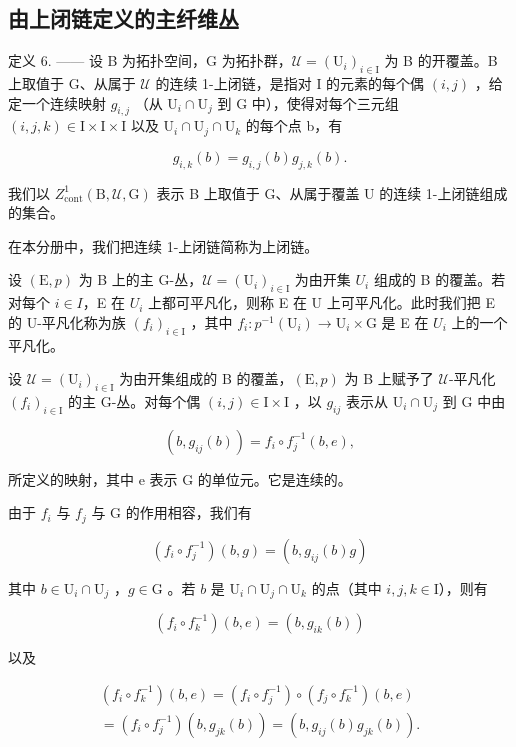 \subsection{由上闭链定义的主纤维丛}

定义 6. —— 设 B 为拓扑空间，G 为拓扑群，\(\mathcal{U} = (\mathrm{U}_{i})_{i\in \mathrm{I}}\) 为 B 的开覆盖。B 上取值于 G、从属于 \(\mathcal{U}\) 的连续 1-上闭链，是指对 I 的元素的每个偶 \((i,j)\) ，给定一个连续映射 \(g_{i,j}\) （从 \(\mathrm{U}_i\cap \mathrm{U}_j\) 到 G 中），使得对每个三元组 \((i,j,k)\in \mathrm{I}\times \mathrm{I}\times \mathrm{I}\) 以及 \(\mathrm{U}_i\cap \mathrm{U}_j\cap \mathrm{U}_k\) 的每个点 b，有

\[
g _ {i, k} (b) = g _ {i, j} (b) g _ {j, k} (b).
\]

我们以 \(Z_{\mathrm{cont}}^{1}(\mathrm{B},\mathcal{U},\mathrm{G})\) 表示 B 上取值于 G、从属于覆盖 U 的连续 1-上闭链组成的集合。

在本分册中，我们把连续 1-上闭链简称为上闭链。

设 \((\mathrm{E},p)\) 为 B 上的主 G-丛，\(\mathcal{U} = (\mathrm{U}_{i})_{i\in\mathrm{I}}\) 为由开集 \(U_{i}\) 组成的 B 的覆盖。若对每个 \(i\in I\)，E 在 \(U_{i}\) 上都可平凡化，则称 E 在 U 上可平凡化。此时我们把 E 的 U-平凡化称为族 \((f_{i})_{i\in\mathrm{I}}\) ，其中 \(f_{i}\colon p^{-1}(\mathrm{U}_{i})\to\mathrm{U}_{i}\times\mathrm{G}\) 是 E 在 \(U_{i}\) 上的一个平凡化。

设 \(\mathcal{U} = (\mathrm{U}_i)_{i\in \mathrm{I}}\) 为由开集组成的 B 的覆盖，\((\mathrm{E},p)\) 为 B 上赋予了 \(\mathcal{U}\)-平凡化 \((f_i)_{i\in \mathrm{I}}\) 的主 G-丛。对每个偶 \((i,j)\in \mathrm{I}\times \mathrm{I}\) ，以 \(g_{ij}\) 表示从 \(\mathrm{U}_i\cap \mathrm{U}_j\) 到 G 中由

\[
(b, g _ {i j} (b)) = f _ {i} \circ f _ {j} ^ {- 1} (b, e),
\]

所定义的映射，其中 e 表示 G 的单位元。它是连续的。

由于 \(f_{i}\) 与 \(f_{j}\) 与 G 的作用相容，我们有

\[
(f _ {i} \circ f _ {j} ^ {- 1}) (b, g) = (b, g _ {i j} (b) g)
\]

其中 \(b \in \mathrm{U}_i \cap \mathrm{U}_j\) ，\(g \in \mathrm{G}\) 。若 \(b\) 是 \(\mathrm{U}_i \cap \mathrm{U}_j \cap \mathrm{U}_k\) 的点（其中 \(i, j, k \in \mathrm{I}\)），则有

\[
(f _ {i} \circ f _ {k} ^ {- 1}) (b, e) = (b, g _ {i k} (b))
\]

以及

\[
\begin{array}{c} (f _ {i} \circ f _ {k} ^ {- 1}) (b, e) = (f _ {i} \circ f _ {j} ^ {- 1}) \circ (f _ {j} \circ f _ {k} ^ {- 1}) (b, e) \\ = (f _ {i} \circ f _ {j} ^ {- 1}) (b, g _ {j k} (b)) = (b, g _ {i j} (b) g _ {j k} (b)). \end{array}
\]

